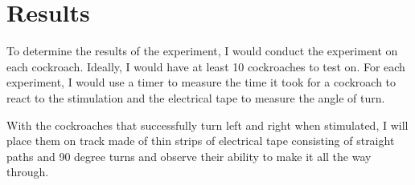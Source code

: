 \section{Results}


To determine the results of the experiment, I would conduct the experiment on each cockroach. Ideally, I would have at least 10 cockroaches to test on. For each experiment, I would use a timer to measure the time it took for a cockroach to react to the stimulation and the electrical tape to measure the angle of turn. 

\bigskip

With the cockroaches that successfully turn left and right when stimulated, I will place them on track made of thin strips of electrical tape consisting of straight paths and 90 degree turns and observe their ability to make it all the way through.


